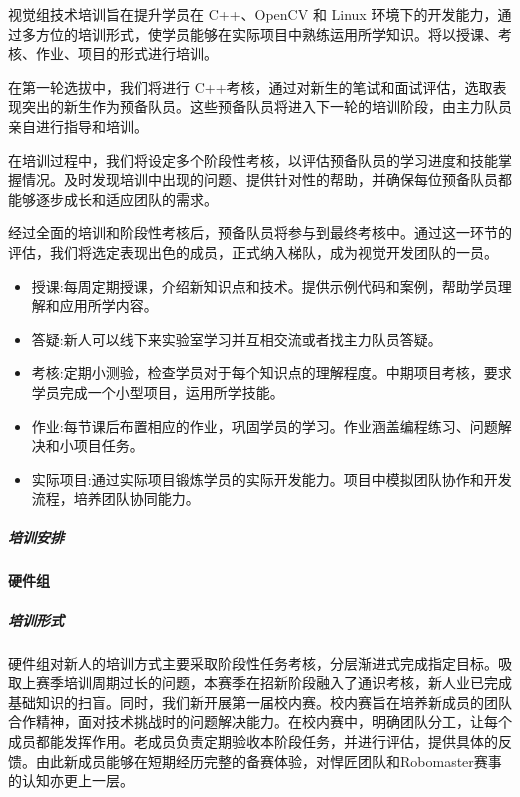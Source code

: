                 视觉组技术培训旨在提升学员在 C++、OpenCV 和 Linux 环境下的开发能力，通过多方位的培训形式，使学员能够在实际项目中熟练运用所学知识。将以授课、考核、作业、项目的形式进行培训。\par
                在第一轮选拔中，我们将进行 C++考核，通过对新生的笔试和面试评估，选取表现突出的新生作为预备队员。这些预备队员将进入下一轮的培训阶段，由主力队员亲自进行指导和培训。\par
                在培训过程中，我们将设定多个阶段性考核，以评估预备队员的学习进度和技能掌握情况。及时发现培训中出现的问题、提供针对性的帮助，并确保每位预备队员都能够逐步成长和适应团队的需求。 \par
                经过全面的培训和阶段性考核后，预备队员将参与到最终考核中。通过这一环节的评估，我们将选定表现出色的成员，正式纳入梯队，成为视觉开发团队的一员。\par
                

                \begin{itemize}
                    \item 授课:每周定期授课，介绍新知识点和技术。提供示例代码和案例，帮助学员理解和应用所学内容。
                    \item 答疑:新人可以线下来实验室学习并互相交流或者找主力队员答疑。
                    \item 考核:定期小测验，检查学员对于每个知识点的理解程度。中期项目考核，要求学员完成一个小型项目，运用所学技能。
                    \item 作业:每节课后布置相应的作业，巩固学员的学习。作业涵盖编程练习、问题解决和小项目任务。
                    \item 实际项目:通过实际项目锻炼学员的实际开发能力。项目中模拟团队协作和开发流程，培养团队协同能力。
                \end{itemize}

            \subparagraph{培训安排}


        \paragraph{硬件组}

            \subparagraph{培训形式}

                硬件组对新人的培训方式主要采取阶段性任务考核，分层渐进式完成指定目标。吸取上赛季培训周期过长的问题，本赛季在招新阶段融入了通识考核，新人业已完成基础知识的扫盲。同时，我们新开展第一届校内赛。校内赛旨在培养新成员的团队合作精神，面对技术挑战时的问题解决能力。在校内赛中，明确团队分工，让每个成员都能发挥作用。老成员负责定期验收本阶段任务，并进行评估，提供具体的反馈。由此新成员能够在短期经历完整的备赛体验，对悍匠团队和Robomaster赛事的认知亦更上一层。

